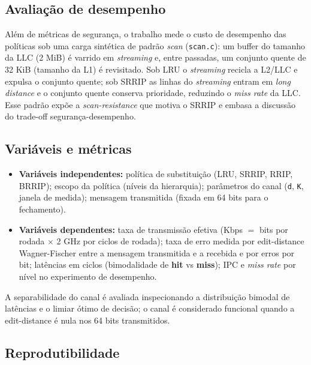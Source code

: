 \subsection{Avaliação de desempenho}

Além de métricas de segurança, o trabalho mede o custo de desempenho das
políticas sob uma carga sintética de padrão \textit{scan}
(\texttt{scan.c}): um buffer do tamanho da LLC (2 MiB) é varrido em
\textit{streaming} e, entre passadas, um conjunto quente de 32 KiB
(tamanho da L1) é revisitado. Sob LRU o \textit{streaming} recicla a
L2/LLC e expulsa o conjunto quente; sob SRRIP as linhas do
\textit{streaming} entram em \textit{long distance} e o conjunto quente
conserva prioridade, reduzindo o \textit{miss rate} da LLC. Esse padrão
expõe a \textit{scan-resistance} que motiva o SRRIP e embasa a discussão do
trade-off segurança-desempenho.

\subsection{Variáveis e métricas}

\begin{itemize}
    \item \textbf{Variáveis independentes:} política de substituição
          (LRU, SRRIP, RRIP, BRRIP); escopo da política (níveis da
          hierarquia); parâmetros do canal (\texttt{d}, \texttt{K}, janela
          de medida); mensagem transmitida (fixada em 64 bits para o
          fechamento).
    \item \textbf{Variáveis dependentes:} taxa de transmissão efetiva
          (Kbps $=$ bits por rodada $\times$ 2 GHz por ciclos de rodada); taxa
          de erro medida por edit-distance Wagner-Fischer entre a mensagem
          transmitida e a recebida e por erros por bit; latências em ciclos
          (bimodalidade de \textbf{hit} vs \textbf{miss}); IPC e \textit{miss
          rate} por nível no experimento de desempenho.
\end{itemize}

A separabilidade do canal é avaliada inspecionando a distribuição bimodal de
latências e o limiar ótimo de decisão; o canal é considerado funcional quando
a edit-distance é nula nos 64 bits transmitidos.

\subsection{Reprodutibilidade}


